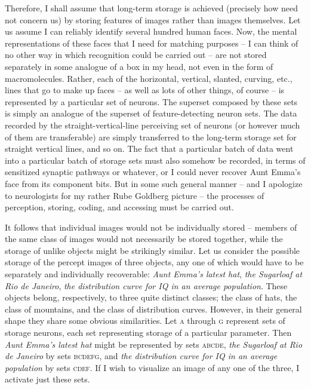 Therefore, I shall assume that long-term storage is achieved (precisely how need not concern us) by storing features of images rather than images themselves. Let us assume I can reliably identify several hundred human faces. Now, the mental representations of these faces that I need for matching purposes -- I can think of no other way in which recognition could be carried out -- are not stored separately in some analogue of a box in my head, not even in the form of macromolecules. Rather, each of the horizontal, vertical, slanted, curving, etc., lines that go to make up faces -- as well as lots of other things, of course -- is represented by a particular set of neurons. The superset
composed by these sets is simply an analogue of the superset of feature-detecting neuron sets. The data recorded by the straight-vertical-line perceiving set of neurons (or however much of them are transferable) are simply transferred to the long-term storage set for straight vertical lines, and so on. The fact that a particular batch of data went into a particular batch of storage sets must also somehow be recorded, in terms of sensitized synaptic pathways or whatever, or I could never recover Aunt Emma's face from its component bits. But in some such general manner -- and I apologize to neurologists for my rather Rube Goldberg picture -- the processes of perception, storing, coding, and accessing must be carried out.

It follows that individual images would not be individually stored -- members of the same class of images would not necessarily be stored together, while the storage of unlike objects might be strikingly similar. Let us consider the possible storage of the percept images of three objects, any one of which would have to be separately and individually recoverable: \textit{Aunt Emma's latest hat}, \textit{the Sugarloaf at Rio de Janeiro}, \textit{the distribution curve for IQ in an average population}. These objects belong, respectively, to three quite distinct classes; the class of hats, the class of mountains, and the class of distribution curves. However, in their general shape they share some obvious similarities. Let \textsc{a} through \textsc{g} represent sets of storage neurons, each set representing storage of a particular parameter. Then \textit{Aunt Emma's latest hat} might be represented by sets \textsc{abcde}, \textit{the Sugarloaf at Rio de Janeiro} by sets \textsc{bcdefg}, and \textit{the distribution curve for IQ in an average population} by sets \textsc{cdef}. If I wish to visualize an image of any one of the three, I activate just these sets.

